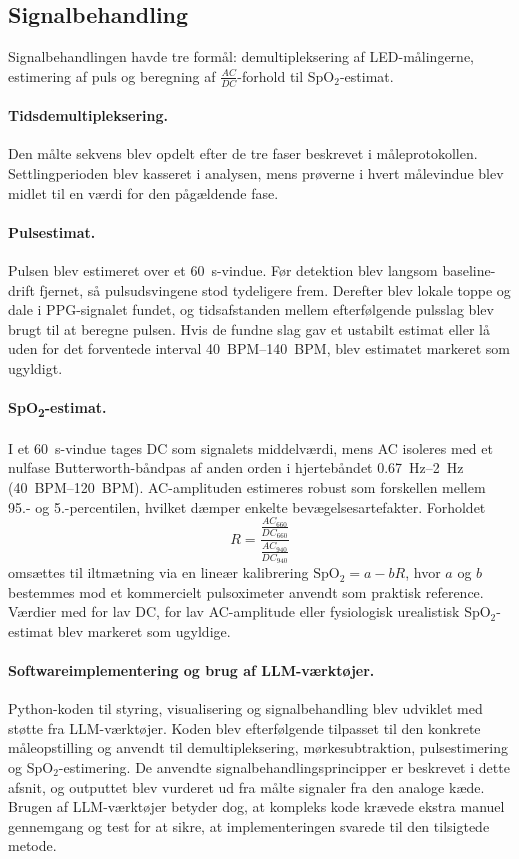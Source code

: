 \subsection{Signalbehandling}
Signalbehandlingen havde tre formål: demultipleksering af LED-målingerne, estimering af puls og beregning af $\frac{AC}{DC}$-forhold til SpO$_2$-estimat.

\paragraph{Tidsdemultipleksering.}
Den målte sekvens blev opdelt efter de tre faser beskrevet i måleprotokollen. Settlingperioden blev kasseret i analysen, mens prøverne i hvert målevindue blev midlet til en værdi for den pågældende fase.

\paragraph{Pulsestimat.}
Pulsen blev estimeret over et \SI{60}{s}-vindue. Før detektion blev langsom baseline-drift fjernet, så pulsudsvingene stod tydeligere frem. Derefter blev lokale toppe og dale i PPG-signalet fundet, og tidsafstanden mellem efterfølgende pulsslag blev brugt til at beregne pulsen. Hvis de fundne slag gav et ustabilt estimat eller lå uden for det forventede interval \SIrange{40}{140}{BPM}, blev estimatet markeret som ugyldigt.

\paragraph{SpO\textsubscript{2}-estimat.}
I et \SI{60}{s}-vindue tages DC som signalets middelværdi, mens AC isoleres
med et nulfase Butterworth-båndpas af anden orden i hjertebåndet \SIrange{0.67}{2}{Hz} (\SIrange{40}{120}{BPM}). AC-amplituden estimeres robust som forskellen mellem 95.- og 5.-percentilen, hvilket dæmper enkelte bevægelsesartefakter. Forholdet
\begin{equation}
\label{eq:ratio_of_ratios_signalbehandling}
  R = \frac{\frac{AC_{660}}{DC_{660}}}{\frac{AC_{940}}{DC_{940}}}
\end{equation}
omsættes til iltmætning via en lineær kalibrering $\mathrm{SpO_2} = a - bR$, hvor $a$ og $b$ bestemmes mod et kommercielt pulsoximeter anvendt som praktisk reference. Værdier med for lav DC, for lav AC-amplitude eller fysiologisk urealistisk SpO$_2$-estimat blev markeret som ugyldige.

\paragraph{Softwareimplementering og brug af LLM-værktøjer.}
Python-koden til styring, visualisering og signalbehandling blev udviklet med støtte fra LLM-værktøjer. Koden blev efterfølgende tilpasset til den konkrete måleopstilling og anvendt til demultipleksering, mørkesubtraktion, pulsestimering og SpO$_2$-estimering. De anvendte signalbehandlingsprincipper er beskrevet i dette afsnit, og outputtet blev vurderet ud fra målte signaler fra den analoge kæde. Brugen af LLM-værktøjer betyder dog, at kompleks kode krævede ekstra manuel gennemgang og test for at sikre, at implementeringen svarede til den tilsigtede metode.

